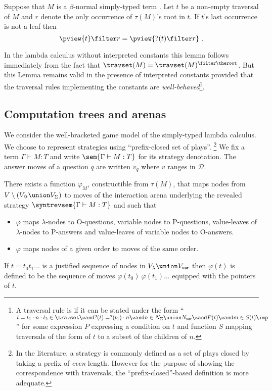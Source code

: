 \begin{lemma}
\label{lem:betanf_trav_pview_red} Suppose that $M$ is a
$\beta$-normal simply-typed term . Let $t$ be a non-empty traversal
of $M$ and $r$ denote the only occurrence of $\tau(M)$'s root in
$t$. If $t$'s last occurrence is not a leaf then
$$ \pview{t} \filter r = \pview{?(t) \filter  r }\ .$$
\end{lemma}
In the lambda calculus without interpreted constants this lemma
follows immediately from the fact that $\travset(M) =
\travset(M)^{\filter \theroot}$. But this Lemma remains valid in the
presence of interpreted constants provided that the traversal rules
implementing the constants are \emph{well-behaved}\footnote{A
traversal rule is  if it can be stated under
the form ``$t = t_1\cdot n \cdot t_2 \in \travset \zand ?(t) =
?(t_1) \cdot n \zand n \in N_{\Sigma}\union N_{\sf var} \zand P(t)
\zand m\in S(t) \imp\ $'' for some expression $P$ expressing a
condition on $t$ and function $S$ mapping traversals of the form of
$t$ to a subset of the children of $n$.}.

\subsection{Computation trees and arenas}
We consider the well-bracketed game model of the simply-typed lambda
calculus.  We choose to represent strategies using ``prefix-closed
set of plays''. \footnote{In the literature, a strategy is commonly
defined as a set of plays closed by taking a prefix of \emph{even}
length. However for the purpose of showing the correspondence with
traversals, the ``prefix-closed''-based definition is more
adequate.} We fix a term $\Gamma \vdash M : T$ and write
$\sem{\Gamma \vdash M : T}$ for its strategy denotation. The answer
moves of a question $q$ are written $v_q$ where $v$ ranges in
$\mathcal{D}$.

\begin{proposition}
There exists a function $\varphi_M$, constructible from $\tau(M)$,
that maps nodes from $V\setminus (V_@ \union V_\Sigma)$ to moves of
the interaction arena underlying the revealed strategy
$\syntrevsem{\Gamma \vdash M : T}$ and such that
\begin{itemize}
\item $\varphi$ maps $\lambda$-nodes to O-questions, variable
nodes to P-questions, value-leaves of $\lambda$-nodes to
P-answers and value-leaves of variable nodes to O-answers.

\item $\varphi$ maps nodes of a given order to moves of
the same order.
\end{itemize}
\end{proposition}
If $t = t_0 t_1 \ldots$ is a justified sequence of nodes in
$V_\lambda \union V_{\sf var}$ then $\varphi(t)$ is defined to
be the sequence of moves $\varphi(t_0)\ \varphi(t_1) \ldots$
equipped with the pointers of $t$.


